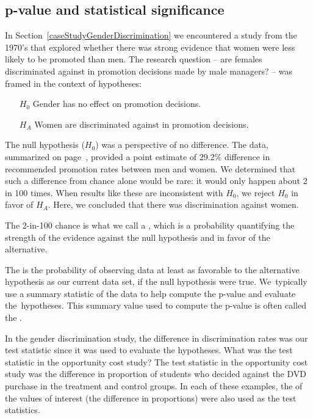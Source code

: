 \subsection{p-value and statistical significance} %

In Section~\ref{caseStudyGenderDiscrimination} we encountered a study from the 1970's that explored whether there was strong evidence that women were less likely to be promoted than men. The research question -- are females discriminated against in promotion decisions made by male managers? -- was framed in the context of hypotheses:
\begin{itemize}
\setlength{\itemsep}{0mm}
\item[$H_0$] Gender has no effect on promotion decisions.
\item[$H_A$] Women are discriminated against in promotion decisions.
\end{itemize}
The null hypothesis ($H_0$) was a perspective of no difference. The data, summarized on page~\pageref{discriminationResults}, provided a point estimate of 29.2\% difference in recommended promotion rates between men and women. We determined that such a difference from chance alone would be rare: it would only happen about 2 in 100 times. When results like these are inconsistent with $H_0$, we reject $H_0$ in favor of $H_A$. Here, we concluded that there was discrimination against women.

The 2-in-100 chance is what we call a , which is a probability quantifying the strength of the evidence against the null hypothesis and in favor of the alternative. %

\begin{termBox}{
The  is the probability of observing data at least as favorable to the alternative hypothesis as our current data set, if the null hypothesis were true. We~typically use a summary statistic of the data to help compute the p-value and evaluate the~hypotheses. This summary value used to compute the p-value is often called the .}
\end{termBox}

\begin{example}{In the gender discrimination study, the difference in discrimination rates was our test statistic since it was used to evaluate the hypotheses. What was the test statistic in the opportunity cost study?}
The test statistic in the opportunity cost study was the difference in proportion of students who decided against the DVD purchase in the treatment and control groups. In each of these examples, the  of the values of interest (the difference in proportions) were  also used as the test statistics.
\end{example}


